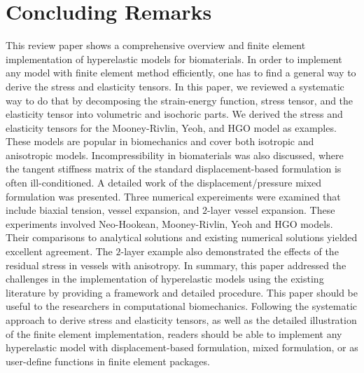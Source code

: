 \section{Concluding Remarks}
\label{conclusions}
This review paper shows a comprehensive overview and finite element implementation of hyperelastic models for biomaterials. In order to implement any model with finite element method efficiently, one has to find a general way to derive the stress and elasticity tensors. In this paper, we reviewed a systematic way to do that by decomposing the strain-energy function, stress tensor, and the elasticity tensor into volumetric and isochoric parts. We derived the stress and elasticity tensors for the Mooney-Rivlin, Yeoh, and HGO model as examples. These models are popular in biomechanics and cover both isotropic and anisotropic models. Incompressibility in biomaterials was also discussed, where the tangent stiffness matrix of the standard displacement-based formulation is often ill-conditioned. A detailed work of the displacement/pressure mixed formulation was presented. Three numerical expereiments were examined that include biaxial tension, vessel expansion, and $2$-layer vessel expansion. These experiments involved Neo-Hookean, Mooney-Rivlin, Yeoh and HGO models. Their comparisons to analytical solutions and existing numerical solutions yielded excellent agreement. The $2$-layer example also demonstrated the effects of the residual stress in vessels with anisotropy. In summary, this paper addressed the challenges in the implementation of hyperelastic models using the existing literature by providing a framework and detailed procedure. This paper should be useful to the researchers in computational biomechanics. Following the systematic approach to derive stress and elasticity tensors, as well as the detailed illustration of the finite element implementation, readers should be able to implement any hyperelastic model with displacement-based formulation, mixed formulation, or as user-define functions in finite element packages. 

